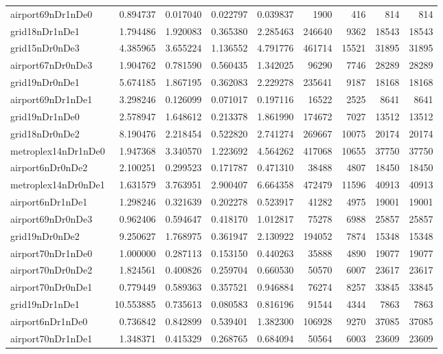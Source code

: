 \documentclass[../../../thesis.tex]{subfiles}
\begin{document}
\begin{longtable}{|l|r|r|r|r|r|r|r|r|}
airport69nDr1nDe0 & 0.894737 & 0.017040 & 0.022797 & 0.039837 & 1900 & 416 & 814 & 814 \\
grid18nDr1nDe1 & 1.794486 & 1.920083 & 0.365380 & 2.285463 & 246640 & 9362 & 18543 & 18543 \\
grid15nDr0nDe3 & 4.385965 & 3.655224 & 1.136552 & 4.791776 & 461714 & 15521 & 31895 & 31895 \\
airport67nDr0nDe3 & 1.904762 & 0.781590 & 0.560435 & 1.342025 & 96290 & 7746 & 28289 & 28289 \\
grid19nDr0nDe1 & 5.674185 & 1.867195 & 0.362083 & 2.229278 & 235641 & 9187 & 18168 & 18168 \\
airport69nDr1nDe1 & 3.298246 & 0.126099 & 0.071017 & 0.197116 & 16522 & 2525 & 8641 & 8641 \\
grid19nDr1nDe0 & 2.578947 & 1.648612 & 0.213378 & 1.861990 & 174672 & 7027 & 13512 & 13512 \\
grid18nDr0nDe2 & 8.190476 & 2.218454 & 0.522820 & 2.741274 & 269667 & 10075 & 20174 & 20174 \\
metroplex14nDr1nDe0 & 1.947368 & 3.340570 & 1.223692 & 4.564262 & 417068 & 10655 & 37750 & 37750 \\
airport6nDr0nDe2 & 2.100251 & 0.299523 & 0.171787 & 0.471310 & 38488 & 4807 & 18450 & 18450 \\
metroplex14nDr0nDe1 & 1.631579 & 3.763951 & 2.900407 & 6.664358 & 472479 & 11596 & 40913 & 40913 \\
airport6nDr1nDe1 & 1.298246 & 0.321639 & 0.202278 & 0.523917 & 41282 & 4975 & 19001 & 19001 \\
airport69nDr0nDe3 & 0.962406 & 0.594647 & 0.418170 & 1.012817 & 75278 & 6988 & 25857 & 25857 \\
grid19nDr0nDe2 & 9.250627 & 1.768975 & 0.361947 & 2.130922 & 194052 & 7874 & 15348 & 15348 \\
airport70nDr1nDe0 & 1.000000 & 0.287113 & 0.153150 & 0.440263 & 35888 & 4890 & 19077 & 19077 \\
airport70nDr0nDe2 & 1.824561 & 0.400826 & 0.259704 & 0.660530 & 50570 & 6007 & 23617 & 23617 \\
airport70nDr0nDe1 & 0.779449 & 0.589363 & 0.357521 & 0.946884 & 76274 & 8257 & 33845 & 33845 \\
grid19nDr1nDe1 & 10.553885 & 0.735613 & 0.080583 & 0.816196 & 91544 & 4344 & 7863 & 7863 \\
airport6nDr1nDe0 & 0.736842 & 0.842899 & 0.539401 & 1.382300 & 106928 & 9270 & 37085 & 37085 \\
airport70nDr1nDe1 & 1.348371 & 0.415329 & 0.268765 & 0.684094 & 50564 & 6003 & 23609 & 23609 \\

\end{longtable}
\end{document}
